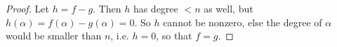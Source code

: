\begin{proof} 
    Let $h = f-g$. Then $h$ has degree $<n$ as well, but $h(\alpha) = f(\alpha)-g(\alpha) = 0$. So $h$ cannot be nonzero, else the degree of $\alpha$ would be smaller than $n$, i.e. $h=0$, so that $f=g$.
\end{proof}
